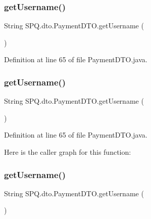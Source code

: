 \subsubsection{\texorpdfstring{get\+Username()}{getUsername()}\hspace{0.1cm}{\footnotesize\ttfamily [1/3]}}
{\footnotesize\ttfamily String S\+P\+Q.\+dto.\+Payment\+D\+T\+O.\+get\+Username (\begin{DoxyParamCaption}{ }\end{DoxyParamCaption})}



Definition at line 65 of file Payment\+D\+T\+O.\+java.

\mbox{\label{class_s_p_q_1_1dto_1_1_payment_d_t_o_a31d0edbb3ec64b406e70cd3deaa5ab1a}} 
\subsubsection{\texorpdfstring{get\+Username()}{getUsername()}\hspace{0.1cm}{\footnotesize\ttfamily [2/3]}}
{\footnotesize\ttfamily String S\+P\+Q.\+dto.\+Payment\+D\+T\+O.\+get\+Username (\begin{DoxyParamCaption}{ }\end{DoxyParamCaption})}



Definition at line 65 of file Payment\+D\+T\+O.\+java.

Here is the caller graph for this function\+:
\mbox{\label{class_s_p_q_1_1dto_1_1_payment_d_t_o_a31d0edbb3ec64b406e70cd3deaa5ab1a}} 
\subsubsection{\texorpdfstring{get\+Username()}{getUsername()}\hspace{0.1cm}{\footnotesize\ttfamily [3/3]}}
{\footnotesize\ttfamily String S\+P\+Q.\+dto.\+Payment\+D\+T\+O.\+get\+Username (\begin{DoxyParamCaption}{ }\end{DoxyParamCaption})}



